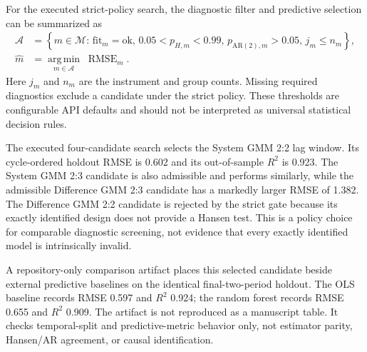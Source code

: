 \documentclass[article]{jss}
\begin{document}
For the executed strict-policy search, the diagnostic filter and predictive selection
can be summarized as
\begin{equation}
\label{eq:auto-search}
\begin{aligned}
\mathcal{A}
  &= \left\{m\in\mathcal{M}:\,
     \mathrm{fit}_m=\mathrm{ok},\,
     0.05<p_{H,m}<0.99,\,
     p_{\mathrm{AR}(2),m}>0.05,\,
     j_m\le n_m\right\}, \\
\widehat{m}
  &= \underset{m\in\mathcal{A}}{\operatorname{arg\,min}}\;
     \operatorname{RMSE}_m.
\end{aligned}
\end{equation}
Here $j_m$ and $n_m$ are the instrument and group counts. Missing required diagnostics
exclude a candidate under the strict policy. These thresholds are configurable API
defaults and should not be interpreted as universal statistical decision rules.

\begin{table}[t!]
\centering
\small
\setlength{\tabcolsep}{4.5pt}
\renewcommand{\arraystretch}{1.16}

\caption{\label{tab:auto-search} Diagnostic-first automatic GMM search on the controlled panel. Source: Author's computation from the executed diagnostic-first search. Notes: Cycle-ordered holdout covers the final two periods. The strict gate rejects the Difference GMM 2:2 candidate because a Hansen test is not reported; the value is not imputed. Selection ranks only admissible candidates and does not establish causal identification.}
\end{table}


The executed four-candidate search selects the System GMM 2:2 lag window. Its cycle-ordered holdout RMSE is
0.602 and its out-of-sample $R^2$ is 0.923. The System GMM 2:3 candidate is also admissible and performs
similarly, while the admissible Difference GMM 2:3 candidate has a markedly larger RMSE of 1.382. The
Difference GMM 2:2 candidate is rejected by the strict gate because its exactly identified design does not
provide a Hansen test. This is a policy choice for comparable diagnostic screening, not evidence that every
exactly identified model is intrinsically invalid.

A repository-only comparison artifact places this selected candidate beside external 
predictive baselines on the identical final-two-period holdout. The  OLS baseline records
RMSE 0.597 and $R^2$ 0.924; the
 random forest records RMSE 0.655 and $R^2$
0.909. The artifact is not reproduced as a manuscript table. It checks temporal-split and
predictive-metric behavior only, not estimator parity, Hansen/AR agreement, or causal identification.
\end{document}
